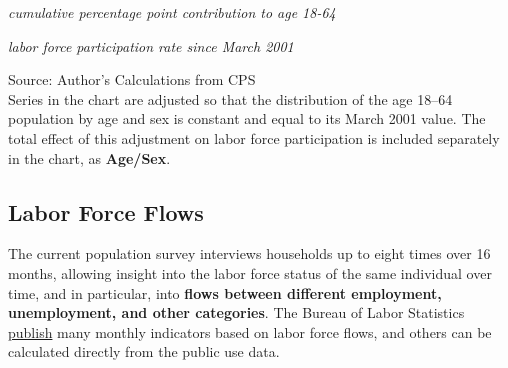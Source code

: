 \documentclass{report}
\makeatletter
\newcommand{\tbllink}[1]{\href{https://raw.githubusercontent.com/bdecon/US-chartbook/master/chartbook/data/#1}{\faTable}}
\newcommand*\short[1]{\expandafter\@gobbletwo\number\numexpr#1\relax}
\newcommand{\stdnode}[3]{\node[below, align=left, shift=({#1,#2})]{#3};}
\newcommand{\dateaxisticks}{
		date coordinates in=x, axis line style={draw=none},
		xmax={2020-10-01},
		max space between ticks=40,	    
		xtick={{1990-01-01}, {1992-01-01}, {1994-01-01}, 
			{1996-01-01}, {1998-01-01}, {2000-01-01}, 
			{2002-01-01}, {2004-01-01}, {2006-01-01},
			{2008-01-01}, {2010-01-01}, {2012-01-01}, {2014-01-01},
		    {2016-01-01}, {2018-01-01}, {2020-01-01}},
		minor xtick={{1989-01-01}, {1991-01-01}, {1993-01-01},
			{1995-01-01}, {1997-01-01}, {1999-01-01}, 
			{2001-01-01}, {2003-01-01}, {2005-01-01}, {2007-01-01},
		    {2009-01-01}, {2011-01-01}, {2013-01-01}, {2015-01-01},
		    {2017-01-01}, {2019-01-01}},
		enlarge y limits={0.06}, enlarge x limits={0.01},
		}
\newcommand{\bbar}[2]{extra #1 ticks = {{#2}}, extra #1 tick labels = ,
		extra #1 tick style = {grid=major, grid style={thick, black!25}},}
\newcommand{\stdline}[4]{\addplot[very thick, no markers, color=#1] 
		table [x=#2, y=#3, col sep=comma] {#4};	}
\newcommand{\thickline}[4]{\addplot[ultra thick, no markers, color=#1] 
		table [x=#2, y=#3, col sep=comma] {#4};	}
\newcommand{\rebars}{
		\fill[color=black!10] (axis cs:{2007-12-01},\pgfkeysvalueof{/pgfplots/ymin}) rectangle 
			(axis cs:{2009-07-01}, \pgfkeysvalueof{/pgfplots/ymax});
		\fill[color=black!10] (axis cs:{2001-03-01},\pgfkeysvalueof{/pgfplots/ymin}) rectangle 
			(axis cs:{2001-11-01}, \pgfkeysvalueof{/pgfplots/ymax});
		\fill[color=black!10] (axis cs:{2020-02-01},\pgfkeysvalueof{/pgfplots/ymin}) rectangle 
			(axis cs:{2020-10-01}, \pgfkeysvalueof{/pgfplots/ymax});}
\makeatother
\begin{document}
{{{{{{{{{\begin{minipage}{0.42\textwidth}
\footnotesize{\textit{cumulative percentage point contribution to age 18-64}}

\footnotesize{\textit{labor force participation rate since March 2001}}

\hspace*{-3mm} 

\footnotesize{Source: Author's Calculations from CPS} \hfill \tbllink{nilf.csv}\\

\footnotesize Series in the chart are adjusted so that the distribution of the age 18--64 population by age and sex is constant and equal to its March 2001 value. The total effect of this adjustment on labor force participation is included separately in the chart, as \color{violet!80!purple}\textbf{Age/Sex}.
\end{minipage}

\newpage
\begin{minipage}{0.76\textwidth}
\subsection*{\color{black!70} \seriffont Labor Force Flows}
\small The current population survey interviews households up to eight times over 16 months, allowing insight into the labor force status of the same individual over time, and in particular, into \textbf{flows between different employment, unemployment, and other categories}. The Bureau of Labor Statistics \href{https://www.bls.gov/cps/cps_flows.htm}{publish} many monthly indicators based on labor force flows, and others can be calculated directly from the public use data.\\


\end{minipage}}}}}}}}}}
\end{document}
